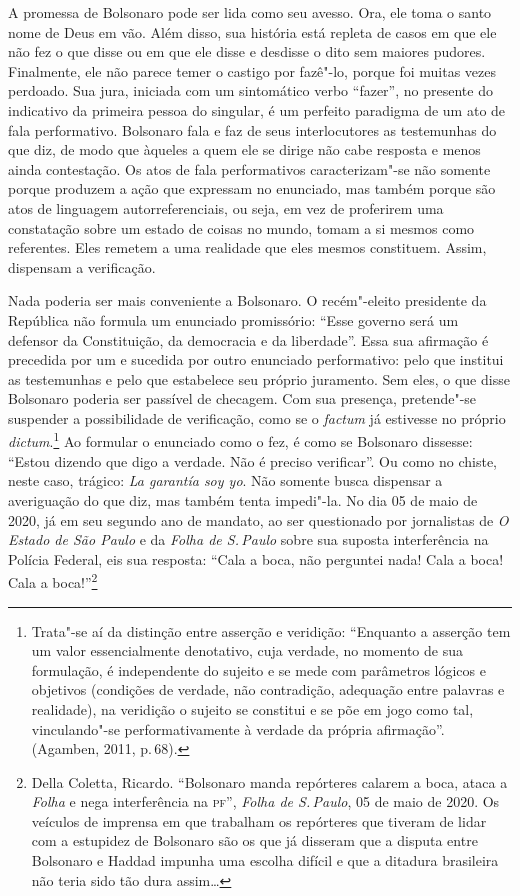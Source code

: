 A promessa de Bolsonaro pode ser lida como seu avesso. Ora, ele toma o
santo nome de Deus em vão. Além disso, sua história está repleta de
casos em que ele não fez o que disse ou em que ele disse e desdisse o
dito sem maiores pudores. Finalmente, ele não parece temer o castigo por
fazê"-lo, porque foi muitas vezes perdoado. Sua jura, iniciada com um
sintomático verbo ``fazer'', no presente do indicativo da primeira
pessoa do singular, é um perfeito paradigma de um ato de fala
performativo. Bolsonaro fala e faz de seus interlocutores as testemunhas
do que diz, de modo que àqueles a quem ele se dirige não cabe resposta e
menos ainda contestação. Os atos de fala performativos caracterizam"-se
não somente porque produzem a ação que expressam no enunciado, mas
também porque são atos de linguagem autorreferenciais, ou seja, em vez
de proferirem uma constatação sobre um estado de coisas no mundo, tomam
a si mesmos como referentes. Eles remetem a uma realidade que eles
mesmos constituem. Assim, dispensam a verificação.

Nada poderia ser mais conveniente a Bolsonaro. O recém"-eleito presidente
da República não formula um enunciado promissório: ``Esse governo será
um defensor da Constituição, da democracia e da liberdade''. Essa sua
afirmação é precedida por um e sucedida por outro enunciado
performativo: pelo que institui as testemunhas e pelo que estabelece seu
próprio juramento. Sem eles, o que disse Bolsonaro poderia ser passível
de checagem. Com sua presença, pretende"-se suspender a possibilidade de
verificação, como se o \emph{factum} já estivesse no próprio
\emph{dictum}.\footnote{Trata"-se aí da distinção entre asserção e
  veridição: ``Enquanto a asserção tem um valor essencialmente
  denotativo, cuja verdade, no momento de sua formulação, é independente
  do sujeito e se mede com parâmetros lógicos e objetivos (condições de
  verdade, não contradição, adequação entre palavras e realidade), na
  veridição o sujeito se constitui e se põe em jogo como tal,
  vinculando"-se performativamente à verdade da própria afirmação''.
  (Agamben, 2011, p.\,68).} Ao formular o enunciado como o fez, é como
se Bolsonaro dissesse: ``Estou dizendo que digo a verdade. Não é preciso
verificar''. Ou como no chiste, neste caso, trágico: \emph{La garantía
soy yo}. Não somente busca dispensar a averiguação do que diz, mas
também tenta impedi"-la. No dia 05 de maio de 2020, já em seu segundo ano
de mandato, ao ser questionado por jornalistas de \emph{O Estado de São
Paulo} e da \emph{Folha de S.\,Paulo} sobre sua suposta interferência na
Polícia Federal, eis sua resposta: ``Cala a boca, não perguntei nada!
Cala a boca! Cala a boca!''\footnote{Della Coletta, Ricardo. ``Bolsonaro
  manda repórteres calarem a boca, ataca a \textit{Folha} e nega interferência na
  \textsc{pf}'', \emph{Folha de S.\,Paulo}, 05 de maio de 2020.
  Os veículos de imprensa em que trabalham os repórteres que tiveram de
  lidar com a estupidez de Bolsonaro são os que já disseram que a
  disputa entre Bolsonaro e Haddad impunha uma escolha difícil e que a
  ditadura brasileira não teria sido tão dura assim\ldots{}}

